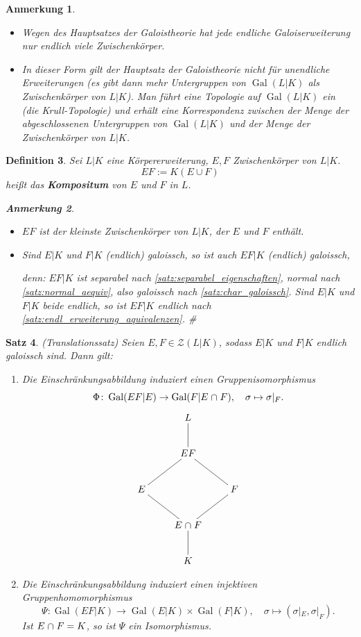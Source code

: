 \documentclass[a4paper, twoside, 11pt, ngerman]{report}
\DeclareMathOperator{\Gal}{Gal}
\renewcommand{\cap}{\;\rotatebox{90}{\reflectbox{\rotatebox{270}{$\cup$}}}\;}
\theoremstyle{definistyle}
\newtheorem{satz}{Satz}[section]
\newtheorem{defini}[satz]{Definition}
\newtheorem{anm}[satz]{Anmerkung}
\theoremstyle{remark}
\newenvironment{denn}%
  {\par\textit{denn:}}%
  {\hfill\#\par}
\newcommand{\defn}[1]{\textit{\bfseries #1}}
\begin{document}
\begin{anm}
\begin{itemize}
\item Wegen des Hauptsatzes der Galoistheorie hat jede endliche Galoiserweiterung nur endlich viele Zwischenkörper.  
\item In dieser Form gilt der Hauptsatz der Galoistheorie nicht für unendliche Erweiterungen (es gibt dann mehr Untergruppen von $\Gal(L|K)$ als Zwischenkörper von $L|K$). Man führt eine Topologie auf $\Gal(L|K)$ ein (die Krull-Topologie) und erhält eine Korrespondenz zwischen der Menge der abgeschlossenen Untergruppen von $\Gal(L|K)$ und der Menge der Zwischenkörper von $L|K$.
\end{itemize}
\end{anm}

\begin{defini}\label{def:komposition_erweiterungen}
Sei $L|K$ eine Körpererweiterung, $E, F$ Zwischenkörper von $L|K$.  
\[EF := K(E \cup F)\]
heißt das \defn{Kompositum} von $E$ und $F$ in $L$.

\begin{anm}
\begin{itemize}
\item $EF$ ist der kleinste Zwischenkörper von $L|K$, der $E$ und $F$ enthält.
\item Sind $E|K$ und $F|K$ (endlich) galoissch, so ist auch $EF|K$ (endlich) galoissch,
\begin{denn}
$EF|K$ ist separabel  nach \ref{satz:separabel_eigenschaften}, normal nach \ref{satz:normal_aequiv}, also galoissch nach \ref{satz:char_galoissch}. Sind $E|K$ und $F|K$ beide endlich, so ist $EF|K$ endlich nach \ref{satz:endl_erweiterung_aquivalenzen}.    
\end{denn}
\end{itemize}
\end{anm}
\end{defini}

\begin{satz}\label{satz:translationssatz}
(Translationssatz)  
Seien $E, F \in \mathcal{Z}(L|K)$, sodass $E|K$ und $F|K$ endlich galoissch sind. Dann gilt:
\begin{enumerate}
    \item[(a)] Die Einschränkungsabbildung induziert einen Gruppenisomorphismus
    \[
    \Phi \colon \Gal(EF|E) \to \Gal(F|E \cap F), \quad \sigma \mapsto \sigma|_F.
    \]
\[
\xymatrix{
 & L \ar@{-}[d] & \\
 & EF \ar@{-}[dl] \ar@{-}[dr] & \\
E \ar@{-}[dr]& & F \ar@{-}[dl] \\
& E\cap F \ar@{-}[d] & \\
& K &
}
\]
    \item[(b)] Die Einschränkungsabbildung induziert einen injektiven Gruppenhomomorphismus
    \[
    \Psi \colon \Gal(EF|K) \to \Gal(E|K) \times \Gal(F|K), \quad \sigma \mapsto (\sigma|_E, \sigma|_F).
    \]
    Ist $E \cap F = K$, so ist $\Psi$ ein Isomorphismus.
\end{enumerate}
\end{satz}
\end{document}
